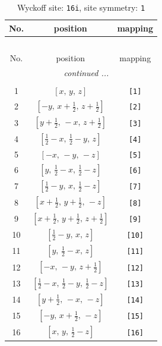 \documentclass[fleqn,8pt]{jsarticle}
\begin{document}
\begin{longtable}{ccc}
\caption{Wyckoff site: {\tt 16i}, site symmetry: {\tt 1}}
 \\
 \hline \hline
No. & position & mapping \\ \hline \endfirsthead

\multicolumn{2}{l}{\tablename\ \thetable{}} \\
 \hline \hline
No. & position & mapping \\ \hline \endhead

 \hline \hline
\multicolumn{2}{r}{\footnotesize\it continued ...} \\ \endfoot

 \hline \hline
\multicolumn{2}{r}{} \\ \endlastfoot

1 & $\left[ x,\, y,\, z \right]$ & {\tt [1]} \\ \hline
2 & $\left[ - y,\, x + \frac{1}{2},\, z + \frac{1}{2} \right]$ & {\tt [2]} \\ \hline
3 & $\left[ y + \frac{1}{2},\, - x,\, z + \frac{1}{2} \right]$ & {\tt [3]} \\ \hline
4 & $\left[ \frac{1}{2} - x,\, \frac{1}{2} - y,\, z \right]$ & {\tt [4]} \\ \hline
5 & $\left[ - x,\, - y,\, - z \right]$ & {\tt [5]} \\ \hline
6 & $\left[ y,\, \frac{1}{2} - x,\, \frac{1}{2} - z \right]$ & {\tt [6]} \\ \hline
7 & $\left[ \frac{1}{2} - y,\, x,\, \frac{1}{2} - z \right]$ & {\tt [7]} \\ \hline
8 & $\left[ x + \frac{1}{2},\, y + \frac{1}{2},\, - z \right]$ & {\tt [8]} \\ \hline
9 & $\left[ x + \frac{1}{2},\, y + \frac{1}{2},\, z + \frac{1}{2} \right]$ & {\tt [9]} \\ \hline
10 & $\left[ \frac{1}{2} - y,\, x,\, z \right]$ & {\tt [10]} \\ \hline
11 & $\left[ y,\, \frac{1}{2} - x,\, z \right]$ & {\tt [11]} \\ \hline
12 & $\left[ - x,\, - y,\, z + \frac{1}{2} \right]$ & {\tt [12]} \\ \hline
13 & $\left[ \frac{1}{2} - x,\, \frac{1}{2} - y,\, \frac{1}{2} - z \right]$ & {\tt [13]} \\ \hline
14 & $\left[ y + \frac{1}{2},\, - x,\, - z \right]$ & {\tt [14]} \\ \hline
15 & $\left[ - y,\, x + \frac{1}{2},\, - z \right]$ & {\tt [15]} \\ \hline
16 & $\left[ x,\, y,\, \frac{1}{2} - z \right]$ & {\tt [16]} \\
\end{longtable}
\end{document}
